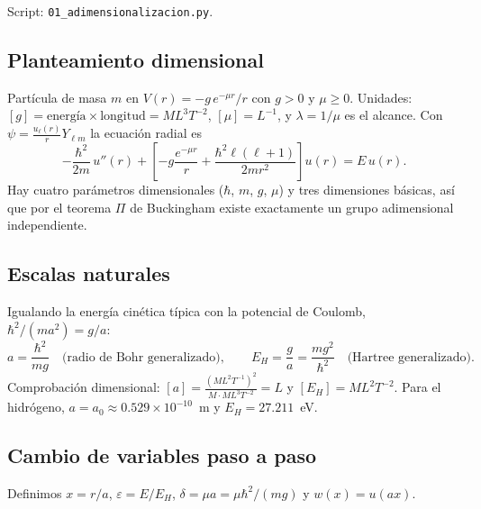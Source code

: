 \documentclass[11pt]{article}
\begin{document}
Script: \texttt{01\_adimensionalizacion.py}.

\subsection{Planteamiento dimensional}

Partícula de masa $m$ en $V(r)=-g\,e^{-\mu r}/r$ con $g>0$ y $\mu\ge0$. Unidades: $[g]=\text{energía}\times\text{longitud}=ML^3T^{-2}$, $[\mu]=L^{-1}$, y $\lambda=1/\mu$ es el alcance. Con $\psi=\frac{u_\ell(r)}{r}Y_{\ell m}$ la ecuación radial es
\begin{equation}
-\frac{\hbar^2}{2m}\,u''(r)+\left[-g\frac{e^{-\mu r}}{r}+\frac{\hbar^2\ell(\ell+1)}{2mr^2}\right]u(r)=E\,u(r).
\label{eq:radial}
\end{equation}
Hay cuatro parámetros dimensionales ($\hbar$, $m$, $g$, $\mu$) y tres dimensiones básicas, así que por el teorema $\Pi$ de Buckingham existe exactamente un grupo adimensional independiente.

\subsection{Escalas naturales}

Igualando la energía cinética típica con la potencial de Coulomb, $\hbar^2/(ma^2)=g/a$:
\[
a=\frac{\hbar^2}{mg}\quad\text{(radio de Bohr generalizado)},\qquad E_H=\frac{g}{a}=\frac{mg^2}{\hbar^2}\quad\text{(Hartree generalizado)}.
\]
Comprobación dimensional: $[a]=\frac{(ML^2T^{-1})^2}{M\cdot ML^3T^{-2}}=L$ y $[E_H]=ML^2T^{-2}$. Para el hidrógeno, $a=a_0\approx0.529\times10^{-10}$~m y $E_H=27.211$~eV.

\subsection{Cambio de variables paso a paso}

Definimos $x=r/a$, $\varepsilon=E/E_H$, $\delta=\mu a=\mu\hbar^2/(mg)$ y $w(x)=u(ax)$.
\end{document}
